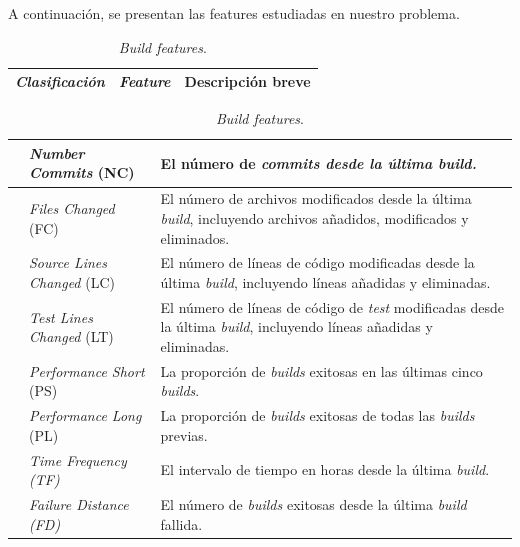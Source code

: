 \noindent A continuación, se presentan las features estudiadas en nuestro problema.

\begin{table}[H]
    \centering
    \caption{\textit{Build features}.}
    \label{tab:features}

    \begin{tabular}{|>{\centering\arraybackslash}m{3cm}|>{\centering\arraybackslash}m{4cm}|>{\centering\arraybackslash}m{7cm}|} %
        \hline
        \textbf{\textit{Clasificación}} &\textbf{\textit{Feature}} & \textbf{Descripción breve} \\
        \hline
    \end{tabular}
    \begin{tabular}{|>{\raggedright\arraybackslash}m{3cm}|>{\raggedright\arraybackslash}m{4cm}|>{\raggedright\arraybackslash}m{7cm}|} %
        \hline
        \multirow{4}{=}{Consideradas en SmartBuildSkip} & \textit{Number Commits} (NC) & El número de \textit{commits desde la última \textit{build}.} \\
        \cline{2-3}
        & \textit{Files Changed} (FC) & El número de archivos modificados desde la última \textit{build}, incluyendo archivos añadidos, modificados y eliminados.\\
        \cline{2-3}
        & \textit{Source Lines Changed} (LC) & El número de líneas de código modificadas desde la última \textit{build}, incluyendo líneas añadidas y eliminadas.\\
        \cline{2-3}
        & \textit{Test Lines Changed} (LT) & El número de líneas de código de \textit{test} modificadas desde la última \textit{build}, incluyendo líneas añadidas y eliminadas.\\
        \Xhline{1pt}
        \multirow{6}{=}{Consideradas en SmartBuildSkip pero no utilizadas} & \textit{Performance Short} (PS) & La proporción de \textit{builds} exitosas en las últimas cinco \textit{builds}.\\
        \cline{2-3}
        & \textit{Performance Long} (PL) & La proporción de \textit{builds} exitosas de todas las \textit{builds} previas.\\
        \cline{2-3}
        & \textit{Time Frequency (TF)} & El intervalo de tiempo en horas desde la última \textit{build}.\\
        \cline{2-3}
        & \textit{Failure Distance (FD)} & El número de \textit{builds} exitosas desde la última \textit{build} fallida.\\

\end{tabular}
\end{table}

